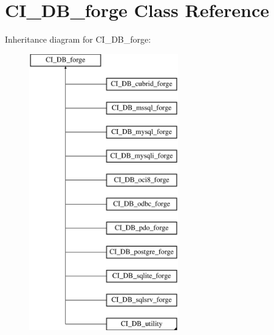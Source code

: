 \hypertarget{class_c_i___d_b__forge}{\section{C\-I\-\_\-\-D\-B\-\_\-forge Class Reference}
\label{class_c_i___d_b__forge}
}
Inheritance diagram for C\-I\-\_\-\-D\-B\-\_\-forge\-:\begin{figure}[H]
\begin{center}
\leavevmode
\includegraphics[height=12.000000cm]{class_c_i___d_b__forge}
\end{center}
\end{figure}
